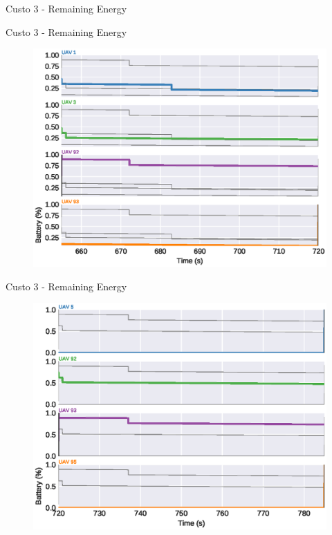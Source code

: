 \begin{frame}{Custo 3 - Remaining Energy}
\begin{figure}[!htb]
                    \end{figure}
                \end{frame}\begin{frame}{Custo 3 - Remaining Energy}
                    \begin{figure}[!htb]
                        \includegraphics[width=\textwidth]{custo_3/uav_remaining_energy_720.eps}
                    \end{figure}
                \end{frame}\begin{frame}{Custo 3 - Remaining Energy}
                    \begin{figure}[!htb]
                        \includegraphics[width=\textwidth]{custo_3/uav_remaining_energy_785.eps}

\end{figure}
\end{frame}
